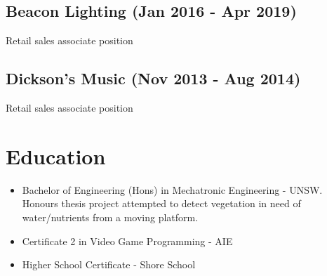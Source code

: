 \documentclass[12pt]{article}
\begin{document}
\begin{FlushLeft}
  \subsection{Beacon Lighting (Jan 2016 - Apr 2019)}
  Retail sales associate position

  \subsection{Dickson's Music (Nov 2013 - Aug 2014)}
  Retail sales associate position
  
  \section{Education}
  \begin{itemize}
  \item Bachelor of Engineering (Hons) in Mechatronic Engineering - UNSW. Honours thesis project attempted to detect vegetation in need of water/nutrients from a moving platform.
  \item Certificate 2 in Video Game Programming - AIE
  \item Higher School Certificate - Shore School 
  \end{itemize}

\end{FlushLeft}
\end{document}
